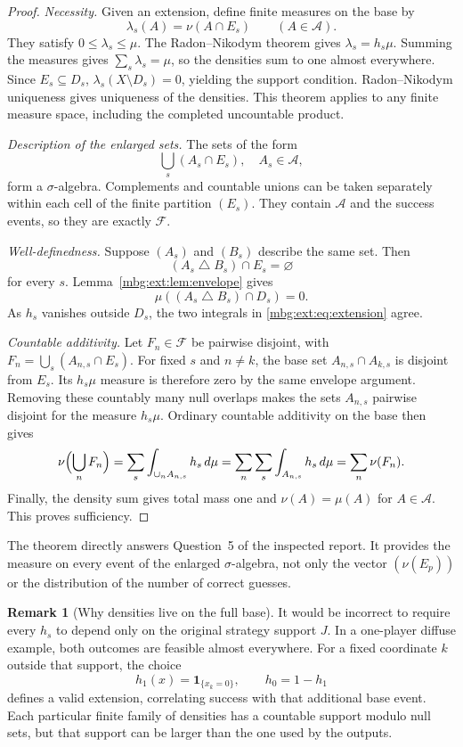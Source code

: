 \documentclass[11pt,letterpaper]{article}
\theoremstyle{definition}
\newtheorem{remark}[theorem]{Remark}
\newcommand{\ind}{\mathbf 1}
\newcommand{\Fext}{\mathcal F}
\newcommand{\A}{\mathcal A}
\begin{document}
\begin{proof}
\emph{Necessity.} Given an extension, define finite measures on the base by
\[
\lambda_s(A)=\nu(A\cap E_s)\qquad(A\in\A).
\]
They satisfy $0\le\lambda_s\le\mu$. The Radon--Nikodym theorem gives $\lambda_s=h_s\mu$. Summing the measures gives $\sum_s\lambda_s=\mu$, so the densities sum to one almost everywhere. Since $E_s\subseteq D_s$, $\lambda_s(X\setminus D_s)=0$, yielding the support condition. Radon--Nikodym uniqueness gives uniqueness of the densities. This theorem applies to any finite measure space, including the completed uncountable product.

\emph{Description of the enlarged sets.} The sets of the form
\[
\bigcup_s(A_s\cap E_s),\quad A_s\in\A,
\]
form a $\sigma$-algebra. Complements and countable unions can be taken separately within each cell of the finite partition $(E_s)$. They contain $\A$ and the success events, so they are exactly $\Fext$.

\emph{Well-definedness.} Suppose $(A_s)$ and $(B_s)$ describe the same set. Then
\[
(A_s\mathbin\triangle B_s)\cap E_s=\varnothing
\]
for every $s$. Lemma~\ref{mbg:ext:lem:envelope} gives
\[
\mu((A_s\mathbin\triangle B_s)\cap D_s)=0.
\]
As $h_s$ vanishes outside $D_s$, the two integrals in \eqref{mbg:ext:eq:extension} agree.

\emph{Countable additivity.} Let $F_n\in\Fext$ be pairwise disjoint, with
$F_n=\bigcup_s(A_{n,s}\cap E_s)$. For fixed $s$ and $n\ne k$, the base set $A_{n,s}\cap A_{k,s}$ is disjoint from $E_s$. Its $h_s\mu$ measure is therefore zero by the same envelope argument. Removing these countably many null overlaps makes the sets $A_{n,s}$ pairwise disjoint for the measure $h_s\mu$. Ordinary countable additivity on the base then gives
\[
\nu\Bigl(\bigcup_n F_n\Bigr)
=\sum_s\int_{\cup_n A_{n,s}}h_s\,d\mu
=\sum_n\sum_s\int_{A_{n,s}}h_s\,d\mu
=\sum_n\nu(F_n).
\]
Finally, the density sum gives total mass one and $\nu(A)=\mu(A)$ for $A\in\A$. This proves sufficiency.
\end{proof}

The theorem directly answers Question~5 of the inspected report. It provides the measure on every event of the enlarged $\sigma$-algebra, not only the vector $(\nu(E_p))$ or the distribution of the number of correct guesses.

\begin{remark}[Why densities live on the full base]
It would be incorrect to require every $h_s$ to depend only on the original strategy support $J$. In a one-player diffuse example, both outcomes are feasible almost everywhere. For a fixed coordinate $k$ outside that support, the choice
\[
h_1(x)=\ind_{\{x_k=0\}},\qquad h_0=1-h_1
\]
defines a valid extension, correlating success with that additional base event. Each particular finite family of densities has a countable support modulo null sets, but that support can be larger than the one used by the outputs.
\end{remark}
\end{document}
